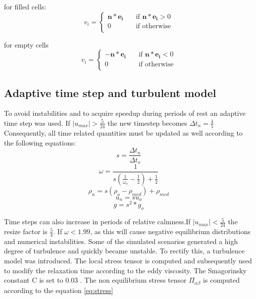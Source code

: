 \documentclass[10pt,a4paper,notitlepage]{article}
\begin{document}
for filled cells:
\begin{equation} \label{eq:filledweight}
  v_i = 
  \begin{cases}
    \mathbf{n*e_{i}}     & \quad \text{if }  \text{$\mathbf{n*e_{i}}>0$}\\
    0			 & \quad \text{if }  \text{otherwise}\\
  \end{cases}
\end{equation}

for empty cells
\begin{equation} \label{eq:emptyweight}
  v_i = 
  \begin{cases}
    -\mathbf{n*e_{i}}     & \quad \text{if }  \text{$\mathbf{n*e_{i}}<0$}\\
    0			  & \quad \text{if }  \text{otherwise}\\
  \end{cases}
\end{equation}

\subsection{Adaptive time step and turbulent model}

To avoid instabilities and to acquire speedup during periods of rest an adaptive time step was used. If $|u_{max}|>\frac{5}{24}$ the new timestep becomes $\Delta t_{n}=\frac{4}{5}$
Consequently, all time related quantities must be updated as well according to the following equations:
\begin{equation} \label{eq:dt}
s=\frac{\Delta t_{n}}{\Delta t_{o}}
\end{equation}
\begin{equation} \label{eq:omega}
\omega=\frac{1}{s(\frac{1}{\omega_{o}}-\frac{1}{2})+\frac{1}{2}}
\end{equation}
\begin{equation} \label{eq:density}
\rho_{n}=s(\rho_{o}-\rho_{med})+\rho_{med}
\end{equation}
\begin{equation} \label{eq:velocity}
u_{n}=su_{o}
\end{equation}
\begin{equation} \label{eq:gravity}
g=s^{2}*g_{o}
\end{equation}

Time steps can also increase in periods of relative calmness.If $|u_{max}|<\frac{5}{24}$ the resize factor is $\frac{5}{4}$. 
If $\omega<1.99$, as this will cause negative equilibrium distributions and numerical instabilities. Some of the simulated scenarios generated a high degree of turbulence and quickly became unstable. To rectify this, a turbulence model was introduced. The local stress tensor is computed and subsequently used to modify the relaxation time according to the eddy viscosity. The Smagorinsky constant C is set to 0.03 \cite{thurey2007physically}. The non equilibrium stress tensor $\Pi_{\alpha\beta}$ is computed according to the equation \eqref{eq:stress}
\end{document}
